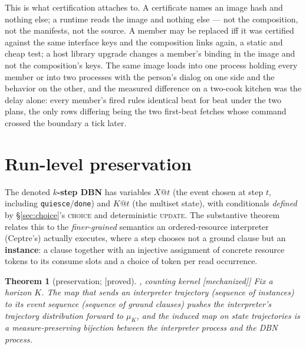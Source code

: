 \documentclass[11pt]{article}
\newcommand{\stproved}{[\textsf{proved}]}
\newcommand{\stmech}{[\textsf{mechanized}]}
\theoremstyle{plain}
\newtheorem{theorem}{Theorem}
\theoremstyle{definition}
\theoremstyle{remark}
\begin{document}
This is what certification attaches to. A certificate names an image
hash and nothing else; a runtime reads the image and nothing else ---
not the composition, not the manifests, not the source. A member may be
replaced iff it was certified against the same interface keys and the
composition links again, a static and cheap test; a host library
upgrade changes a member's binding in the image and not the
composition's keys. The same image loads into one process holding every
member or into two processes with the person's dialog on one side and
the behavior on the other, and the measured difference on a two-cook
kitchen was the delay alone: every member's fired rules identical beat
for beat under the two plans, the only rows differing being the two
first-beat fetches whose command crossed the boundary a tick later.

\section{Run-level preservation}\label{sec:preservation}

The denoted \textbf{$k$-step DBN} has variables $X@t$ (the event chosen
at step $t$, including \texttt{quiesce}/\texttt{done}) and $K@t$ (the
multiset state), with conditionals \emph{defined} by
\S\ref{sec:choice}'s \textsc{choice} and deterministic \textsc{update}.
The substantive theorem relates this to the \emph{finer-grained}
semantics an ordered-resource interpreter (Ceptre's) actually executes,
where a step chooses not a ground clause but an \textbf{instance}: a
clause together with an injective assignment of concrete resource tokens
to its consume slots and a choice of token per read occurrence.

\begin{theorem}[preservation; \stproved{}, counting kernel \stmech{}]
\label{thm:preservation}
Fix a horizon $K$. The map that sends an interpreter trajectory
(sequence of instances) to its event sequence (sequence of ground
clauses) pushes the interpreter's trajectory distribution forward to
$\mu_K$, and the induced map on state trajectories is a
measure-preserving bijection between the interpreter process and the DBN
process.
\end{theorem}
\end{document}
